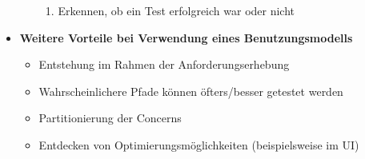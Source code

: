 \begin{itemize}
\begin{itemize}
\begin{enumerate}
			\item Erkennen, ob ein Test erfolgreich war oder nicht
		\end{enumerate}
	\end{itemize}
	\item \textbf{Weitere Vorteile bei Verwendung eines Benutzungsmodells}
	\begin{itemize}
		\item Entstehung im Rahmen der Anforderungserhebung
		\item Wahrscheinlichere Pfade können öfters/besser getestet werden
		\item Partitionierung der Concerns
		\item Entdecken von Optimierungsmöglichkeiten (beispielsweise im UI)
	\end{itemize}
\end{itemize}